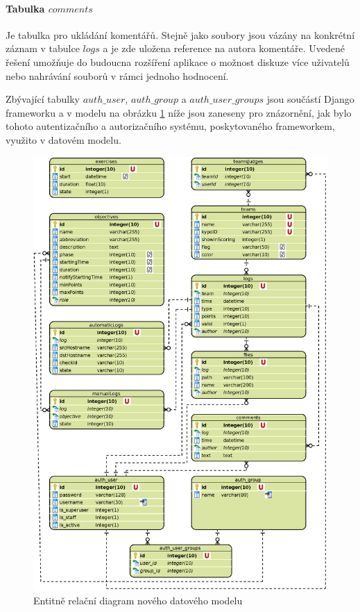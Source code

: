 \documentclass[
  digital,
  twoside,
  table, 
  nolof, 
  nolot
]{fithesis3}
\begin{document}
\paragraph{Tabulka $comments$} Je tabulka pro ukládání komentářů. Stejně jako soubory jsou vázány na konkrétní záznam v tabulce $logs$ a je zde uložena reference na autora komentáře. Uvedené řešení umožňuje do budoucna rozšíření aplikace o možnost diskuze více uživatelů nebo nahrávání souborů v rámci jednoho hodnocení.

Zbývající tabulky $auth\_user$, $auth\_group$ a $auth\_user\_groups$ jsou součástí Django frameworku a v modelu na obrázku \ref{fig:erdNewApp} níže jsou zaneseny pro znázornění, jak bylo tohoto autentizačního a autorizačního systému, poskytovaného frameworkem, využito v datovém modelu.

\begin{figure}
    \centering
    \includegraphics[width=12.5cm]{images/ERD-new-app.eps}
    \caption{Entitně relační diagram nového datového modelu}
    \label{fig:erdNewApp}
\end{figure}
\end{document}
